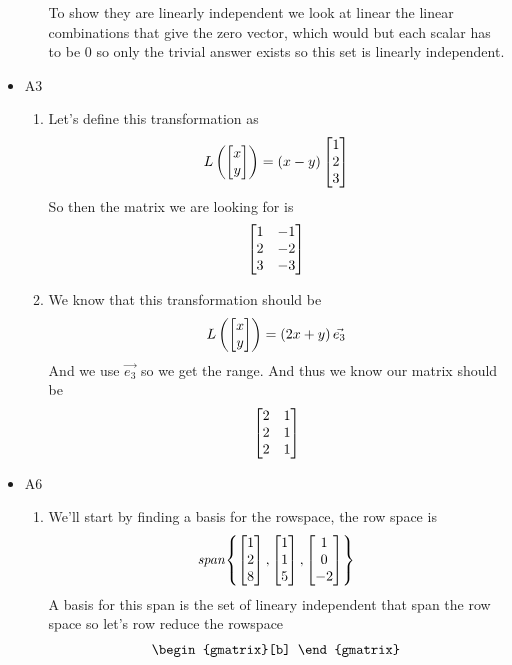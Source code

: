\documentclass[11pt]{book}
\begin{document}
\begin{ex}
\begin{itemize}
\begin{enumerate}
\[                \]
                To show they are linearly independent we look at linear the linear combinations that give the zero vector, which would but each scalar has to be 0 so only the trivial answer exists so this set is linearly independent.
            \end{enumerate}
        \item A3
            \begin{enumerate}
                \item Let's define this transformation as 
                    \[
                        L\left(\begin{bmatrix} x \\ y \end{bmatrix}\right) = \left( x - y \right) \begin{bmatrix} 1 \\ 2 \\ 3 \end{bmatrix}
                    \]
                    So then the matrix we are looking for is 
                   \[
                    \begin{bmatrix} 1 & -1 \\ 2 & -2 \\ 3 & -3 \end{bmatrix}
                    \]
                \item We know that this transformation should be
                    \[
                        L\left(\begin{bmatrix} x \\ y \end{bmatrix}\right) = \left( 2x + y \right) \vec{e_3}
                    \]
                    And we use $\vec{e_3}$ so we get the range. And thus we know our matrix should be
                    \[
                    \begin{bmatrix} 2 & 1 \\ 2 & 1 \\ 2 & 1 \end{bmatrix}
                    \]
            \end{enumerate}
        \item A6
            \begin{enumerate}
                \item We'll start by finding a basis for the rowspace, the row space is 
                    \[
                        \mathit{span} {\left\{ \begin{bmatrix} 1 \\ 2 \\ 8 \end{bmatrix}, \begin{bmatrix} 1 \\ 1 \\ 5 \end{bmatrix}, \begin{bmatrix} 1 \\ 0 \\ -2 \end{bmatrix} \right\}} 
                    \]
                    A basis for this span is the set of lineary independent that span the row space so let's row reduce the rowspace
                    \begin{gather*}
                        \begin{gmatrix}[b]

\end{gmatrix}
\end{gather*}
\end{enumerate}
\end{itemize}
\end{ex}
\end{document}

